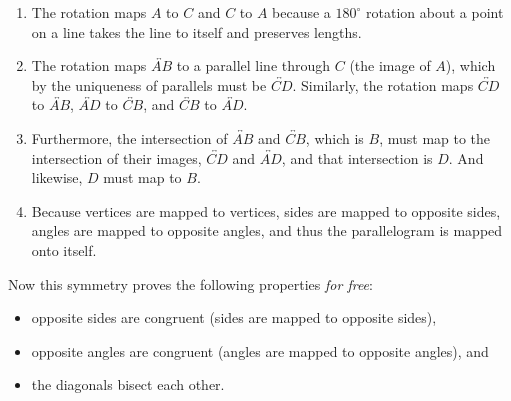 \documentclass[nooutcomes]{ximera}
\begin{document}
\begin{problem}
\begin{enumerate}
\item The rotation maps $A$ to $C$ and $C$ to $A$ because a $180^\circ$ rotation about a point on a line takes the line to itself and preserves lengths.
\item The rotation maps $\overleftrightarrow{AB}$ to a parallel line through $C$ (the image of $A$), which by the uniqueness of parallels must 
be $\overleftrightarrow{CD}$.  Similarly, the rotation maps 
$\overleftrightarrow{CD}$ to $\overleftrightarrow{AB}$, 
$\overleftrightarrow{AD}$ to $\overleftrightarrow{CB}$, and
$\overleftrightarrow{CB}$ to $\overleftrightarrow{AD}$.
\item Furthermore, the intersection of $\overleftrightarrow{AB}$ and $\overleftrightarrow{CB}$, which is $B$, must map to the intersection of their images, $\overleftrightarrow{CD}$ and $\overleftrightarrow{AD}$, and that intersection is $D$.  And likewise, $D$ must map to $B$.
\item Because vertices are mapped to vertices, sides are mapped to opposite sides, angles are mapped to opposite angles, and thus the parallelogram is mapped onto itself.  
\end{enumerate}

Now this symmetry proves the following properties \emph{for free}:  

\begin{itemize}
\item opposite sides are congruent (sides are mapped to opposite sides), 
\item opposite angles are congruent (angles are mapped to opposite angles), and 
\item the diagonals bisect each other.

\end{itemize}

\end{problem}
\end{document}
